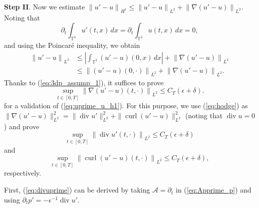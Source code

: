 \documentclass[reqno,10pt]{amsart}
\theoremstyle{definition}
\theoremstyle{remark}
\numberwithin{equation}{section}
\DeclareMathOperator{\dive}{div}
\DeclareMathOperator{\curl}{curl}
\begin{document}
\textbf{Step II}. Now we estimate ${\|u'-u\|}_{H^1} \le {\|u'-u\|}_{L^2}+{\|\nabla(u'-u)\|}_{L^2}$. Noting that
\[
    \partial_t\int_{\mathbb T^3} u'(t,x)\,dx=\partial_t\int_{\mathbb T^3} u(t,x)\,dx=0,
\]
and using the Poincar\'e inequality, we obtain
\[
\begin{aligned}
    {\|u'-u\|}_{L^2} &\le \left | \int_{\mathbb T^3} (u'-u)(0,x)\,dx \right| + {\|\nabla(u'-u)\|}_{L^2} \\
    &\le {\|(u'-u)(0,\cdot)\|}_{L^2} + {\|\nabla(u'-u)\|}_{L^2}.
\end{aligned}
\]
Thanks to (\ref{eq:3dp_assump_1}), it suffices to prove
\begin{equation}
    \sup_{t\in[0,T]}{\| \nabla(u'-u)(t,\cdot)\|}_{L^2} \le C_T(\epsilon+\delta).
\end{equation}
for a validation of (\ref{eq:uprime_u_h1}). For this purpose, we use (\ref{eq:hodge}) as $\|\nabla(u'-u)\|_{L^2}^2 = \|\dive u'\|_{L^2}^2 + \|\curl(u'-u)\|_{L^2}^2$ (noting that $\dive u=0$) and prove 
\begin{equation} \label{eq:divuprime}
    \sup_{t\in[0,T]} {\| \dive u'(t,\cdot)\|}_{L^2} \le C_T(\epsilon+\delta)
\end{equation}
and
\begin{equation} \label{eq:curluprime_u_L2}
    \sup_{t\in[0,T]}{ \| \curl(u'-u)(t,\cdot)\|}_{L^2} \le C_T(\epsilon+\delta),
\end{equation}
respectively.

First, (\ref{eq:divuprime}) can be derived by taking $\mathcal{A} = \partial_t$ in (\ref{eq:Apprime_p}) and using $\partial_t p' = -\epsilon^{-1} \dive u'$.
\end{document}

